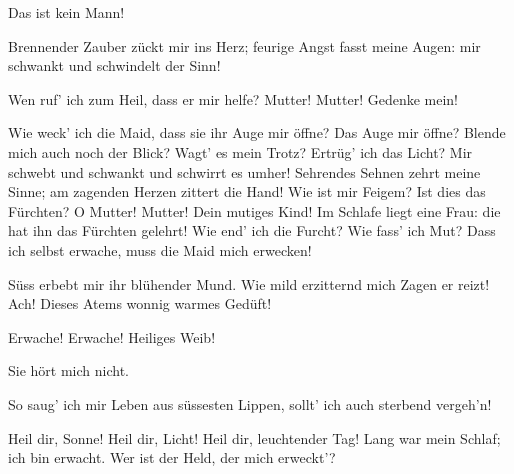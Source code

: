 \begin{drama}
Das ist kein Mann!


Brennender Zauber
zückt mir ins Herz;
feurige Angst
fasst meine Augen:
mir schwankt und schwindelt der Sinn!


Wen ruf' ich zum Heil,
dass er mir helfe?
Mutter! Mutter!
Gedenke mein!


Wie weck' ich die Maid,
dass sie ihr Auge mir öffne?
Das Auge mir öffne?
Blende mich auch noch der Blick?
Wagt' es mein Trotz?
Ertrüg' ich das Licht?
Mir schwebt und schwankt
und schwirrt es umher!
Sehrendes Sehnen
zehrt meine Sinne;
am zagenden Herzen
zittert die Hand!
Wie ist mir Feigem?
Ist dies das Fürchten?
O Mutter! Mutter!
Dein mutiges Kind!
Im Schlafe liegt eine Frau:
die hat ihn das Fürchten gelehrt!
Wie end' ich die Furcht?
Wie fass' ich Mut?
Dass ich selbst erwache,
muss die Maid mich erwecken!


Süss erbebt mir
ihr blühender Mund.
Wie mild erzitternd
mich Zagen er reizt!
Ach! Dieses Atems
wonnig warmes Gedüft!


Erwache! Erwache!
Heiliges Weib!


Sie hört mich nicht.


So saug' ich mir Leben
aus süssesten Lippen,
sollt' ich auch sterbend vergeh'n!


\Brunnhildespeaks

Heil dir, Sonne!
Heil dir, Licht!
Heil dir, leuchtender Tag!
Lang war mein Schlaf;
ich bin erwacht.
Wer ist der Held,
der mich erweckt'?


\end{drama}
